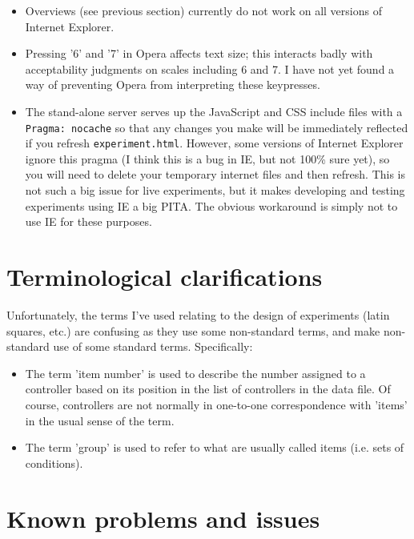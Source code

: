 \documentclass[
]{article}
\begin{document}
\begin{itemize}
\item
  Overviews (see previous section) currently do not work on all versions
  of Internet Explorer.
\item
  Pressing '6' and '7' in Opera affects text size; this interacts badly
  with acceptability judgments on scales including 6 and 7. I have not
  yet found a way of preventing Opera from interpreting these
  keypresses.
\item
  The stand-alone server serves up the JavaScript and CSS include files
  with a \texttt{Pragma:\ nocache} so that any changes you make will be
  immediately reflected if you refresh \texttt{experiment.html}.
  However, some versions of Internet Explorer ignore this pragma (I
  think this is a bug in IE, but not 100\% sure yet), so you will need
  to delete your temporary internet files and then refresh. This is not
  such a big issue for live experiments, but it makes developing and
  testing experiments using IE a big PITA. The obvious workaround is
  simply not to use IE for these purposes.
\end{itemize}

\hypertarget{terminological-clarifications}{%
\section{Terminological
clarifications}\label{terminological-clarifications}}

Unfortunately, the terms I've used relating to the design of experiments
(latin squares, etc.) are confusing as they use some non-standard terms,
and make non-standard use of some standard terms. Specifically:

\begin{itemize}
\item
  The term 'item number' is used to describe the number assigned to a
  controller based on its position in the list of controllers in the
  data file. Of course, controllers are not normally in one-to-one
  correspondence with 'items' in the usual sense of the term.
\item
  The term 'group' is used to refer to what are usually called items
  (i.e. sets of conditions).
\end{itemize}

\hypertarget{known-problems-and-issues}{%
\section{Known problems and issues}\label{known-problems-and-issues}}
\end{document}
